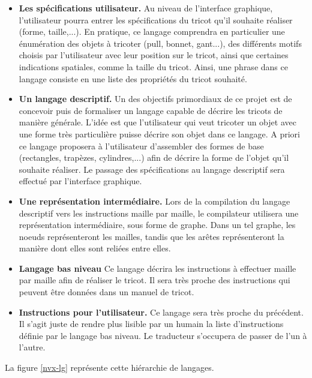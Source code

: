 \documentclass{article}
\begin{document}
\begin{itemize}
 \item \textbf{Les spécifications utilisateur.} Au niveau de l'interface graphique, l'utilisateur pourra entrer les spécifications du tricot qu'il souhaite réaliser (forme, taille,...). En pratique, ce langage comprendra en particulier une énumération des objets à tricoter (pull, bonnet, gant...), des différents motifs choisis par l'utilisateur avec leur position sur le tricot, ainsi que certaines indications spatiales, comme la taille du tricot. Ainsi, une phrase dans ce langage consiste en une liste des propriétés du tricot souhaité.
 \item \textbf{Un langage descriptif.} Un des objectifs primordiaux de ce projet est de concevoir puis de formaliser un langage capable de décrire les tricots de manière générale. L'idée est que l'utilisateur qui veut tricoter un objet avec une forme très particulière puisse décrire son objet dans ce langage. A priori ce langage proposera à l'utilisateur d'assembler des formes de base (rectangles, trapèzes, cylindres,...) afin de décrire la forme de l'objet qu'il souhaite réaliser. Le passage des spécifications au langage descriptif sera effectué par l'interface graphique.
 \item \textbf{Une représentation intermédiaire.} Lors de la compilation du langage descriptif vers les instructions maille par maille, le compilateur utilisera une représentation intermédiaire, sous forme de graphe. Dans un tel graphe, les noeuds représenteront les mailles, tandis que les arêtes représenteront la manière dont elles sont reliées entre elles.
 \item \textbf{Langage bas niveau} Ce langage décrira les instructions à effectuer maille par maille afin de réaliser le tricot. Il sera très proche des instructions qui peuvent être données dans un manuel de tricot.
 \item \textbf{Instructions pour l'utilisateur.} Ce langage sera très proche du précédent. Il s'agit juste de rendre plus lisible par un humain la liste d'instructions définie par le langage bas niveau. Le traducteur s'occupera de passer de l'un à l'autre.
\end{itemize}

La figure \ref{nvx-lg} représente cette hiérarchie de langages.
\end{document}

